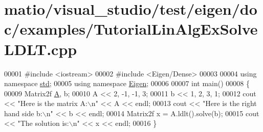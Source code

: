 \hypertarget{matio_2visual__studio_2test_2eigen_2doc_2examples_2_tutorial_lin_alg_ex_solve_l_d_l_t_8cpp_source}{}\section{matio/visual\+\_\+studio/test/eigen/doc/examples/\+Tutorial\+Lin\+Alg\+Ex\+Solve\+L\+D\+LT.cpp}
\label{matio_2visual__studio_2test_2eigen_2doc_2examples_2_tutorial_lin_alg_ex_solve_l_d_l_t_8cpp_source}

\begin{DoxyCode}
00001 \textcolor{preprocessor}{#include <iostream>}
00002 \textcolor{preprocessor}{#include <Eigen/Dense>}
00003 
00004 \textcolor{keyword}{using namespace }\hyperlink{namespacestd}{std};
00005 \textcolor{keyword}{using namespace }\hyperlink{namespace_eigen}{Eigen};
00006 
00007 \textcolor{keywordtype}{int} main()
00008 \{
00009    Matrix2f \hyperlink{group___core___module_class_eigen_1_1_matrix}{A}, b;
00010    A << 2, -1, -1, 3;
00011    b << 1, 2, 3, 1;
00012    cout << \textcolor{stringliteral}{"Here is the matrix A:\(\backslash\)n"} << A << endl;
00013    cout << \textcolor{stringliteral}{"Here is the right hand side b:\(\backslash\)n"} << b << endl;
00014    Matrix2f x = A.ldlt().solve(b);
00015    cout << \textcolor{stringliteral}{"The solution is:\(\backslash\)n"} << x << endl;
00016 \}
\end{DoxyCode}
